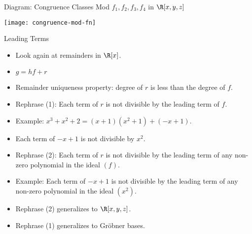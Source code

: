 \documentclass{beamer}
\begin{document}

\begin{frame}{Diagram: Congruence Classes Mod $f_1,f_2,f_3,f_4$ in $\R[x,y,z]$}

\begin{center}
\texttt{[image: congruence-mod-fn]}
\end{center}

\end{frame}



\begin{frame}{Leading Terms}

\begin{itemize}
  \item Look again at remainders in $\R[x]$.
  \item $g=hf + r$
  \item Remainder uniqueness property: degree of $r$ is less than the degree of $f$.
  \item Rephrase (1): Each term of $r$ is not divisible by the leading term of $f$.
  \item Example: $x^3 + x^2 + 2 = (x+1)(x^2+1) + ( -x + 1)$.
  \item Each term of $-x+1$ is not divisible by $x^2$.
  \item Rephrase (2): Each term of $r$ is not divisible by the leading term of any non-zero polynomial in the ideal $(f)$.
  \item Example: Each term of $-x+1$ is not divisible by the leading term of any non-zero polynomial in the ideal $(x^2)$.
  \item Rephrase (2) generalizes to $\R[x,y,z]$.
  \item Rephrase (1) generalizes to Gr\"{o}bner bases.
\end{itemize}

\end{frame}
\end{document}
